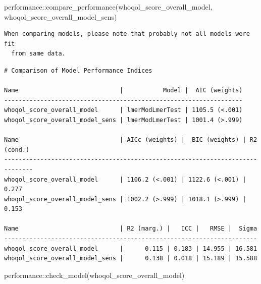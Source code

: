 \documentclass[
  letterpaper,
  DIV=11,
  numbers=noendperiod]{scrartcl}
\newenvironment{Shaded}{\begin{snugshade}}{\end{snugshade}}
\newcommand{\FunctionTok}[1]{\textcolor[rgb]{0.28,0.35,0.67}{#1}}
\newcommand{\NormalTok}[1]{\textcolor[rgb]{0.00,0.23,0.31}{#1}}
\newcommand{\SpecialCharTok}[1]{\textcolor[rgb]{0.37,0.37,0.37}{#1}}
\begin{document}
\begin{Shaded}
\begin{Highlighting}[]
\NormalTok{performance}\SpecialCharTok{::}\FunctionTok{compare\_performance}\NormalTok{(whoqol\_score\_overall\_model, whoqol\_score\_overall\_model\_sens)}
\end{Highlighting}
\end{Shaded}

\begin{verbatim}
When comparing models, please note that probably not all models were fit
  from same data.
\end{verbatim}

\begin{verbatim}
# Comparison of Model Performance Indices

Name                            |           Model |  AIC (weights)
------------------------------------------------------------------
whoqol_score_overall_model      | lmerModLmerTest | 1105.5 (<.001)
whoqol_score_overall_model_sens | lmerModLmerTest | 1001.4 (>.999)

Name                            | AICc (weights) |  BIC (weights) | R2 (cond.)
------------------------------------------------------------------------------
whoqol_score_overall_model      | 1106.2 (<.001) | 1122.6 (<.001) |      0.277
whoqol_score_overall_model_sens | 1002.2 (>.999) | 1018.1 (>.999) |      0.153

Name                            | R2 (marg.) |   ICC |   RMSE |  Sigma
----------------------------------------------------------------------
whoqol_score_overall_model      |      0.115 | 0.183 | 14.955 | 16.581
whoqol_score_overall_model_sens |      0.138 | 0.018 | 15.189 | 15.588
\end{verbatim}

\begin{Shaded}
\begin{Highlighting}[]
\NormalTok{performance}\SpecialCharTok{::}\FunctionTok{check\_model}\NormalTok{(whoqol\_score\_overall\_model)}
\end{Highlighting}
\end{Shaded}
\end{document}
